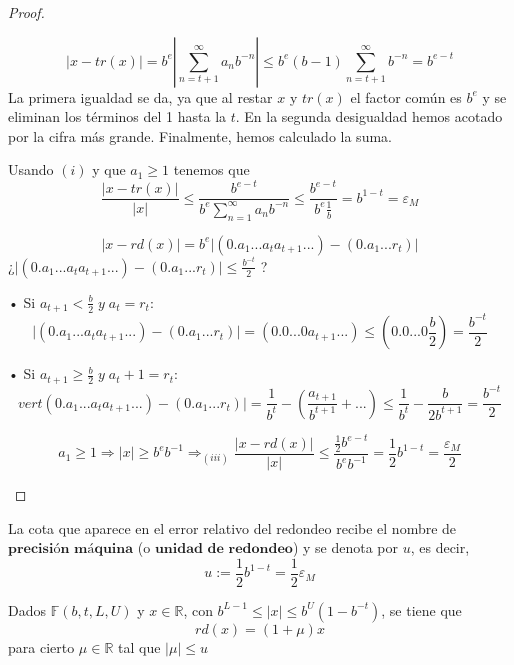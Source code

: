 \begin{proof}
$ $
	\begin{nlist}
	\item 
	\[ \vert x - tr(x) \vert = b^e \left\vert \sum_{n=t+1}^{\infty} a_nb^{-n} \right\vert \leq b^e(b-1) \sum_{n=t+1}^{\infty} b^{-n} = b^{e-t} \]
	La primera igualdad se da, ya que al restar $x$ y $tr(x)$ el factor común es $b^e$ y se eliminan los términos del 1 hasta la $t$. En la segunda desigualdad hemos acotado por la cifra más grande. Finalmente, hemos calculado la suma.
	\item Usando $(i)$ y que $a_1 \geq 1$ tenemos que 
	\[ \frac{\vert x - tr(x) \vert}{\vert x \vert} \leq \frac{b^{e-t}}{b^e \sum_{n=1}^{\infty} a_nb^{-n}} \leq \frac{b^{e-t}}{b^e \frac{1}{b}} = b^{1-t} = \varepsilon _M \]
	\item 
	\[ \vert x - rd(x) \vert = b^e \vert (0.a_1...a_ta_{t+1}...) - (0.a_1...r_t) \vert \]
	 ¿$ \vert (0.a_1...a_ta_{t+1}...) - (0.a_1...r_t) \vert \leq \frac{b^{-t}}{2}$ ?
		\item[•] Si $a_{t+1} < \frac{b}{2} \; y \; a_t = r_t$:
		\[ \vert (0.a_1...a_ta_{t+1}...) - (0.a_1...r_t) \vert = (0.0...0a_{t+1}...) \leq (0.0...0 \frac{b}{2}) = \frac{b^{-t}}{2} \]
		\item[•] Si $a_{t+1} \geq \frac{b}{2} \; y \; a_t + 1 = r_t$:
		\[ vert (0.a_1...a_ta_{t+1}...) - (0.a_1...r_t) \vert = \frac{1}{b^t} - \left( \frac{a_{t+1}}{b^{t+1}} + ... \right) \leq \frac{1}{b^t} - \frac{b}{2b^{t+1}} = \frac{b^{-t}}{2} \]
	\item \[ a_1 \geq 1 \Rightarrow \vert x \vert \geq b^eb^{-1} \Rightarrow _{(iii)} \frac{\vert x - rd(x) \vert }{\vert x \vert} \leq \frac{\frac{1}{2}b^{e-t}}{b^eb^{-1}} = \frac{1}{2}b^{1-t} = \frac{\varepsilon _M}{2} \]
	\end{nlist}	
\end{proof}

\begin{ndef}
La cota que aparece en el error relativo del redondeo recibe el nombre de $\textbf{precisión máquina}$ (o $\textbf{unidad de redondeo}$) y se denota por $u$, es decir,
\[ u := \frac{1}{2}b^{1-t} = \frac{1}{2} \varepsilon _M \]
\end{ndef}

\begin{ncor}
Dados $\mathbb{F} (b,t,L,U)$ y $x \in \mathbb{R}$, con $b^{L-1} \leq \vert x \vert \leq b^U(1 - b^{-t})$, se tiene que
\[ rd(x) = (1 + \mu )x \]
para cierto $\mu \in \mathbb{R}$ tal que $\vert \mu \vert \leq u$
\end{ncor}

